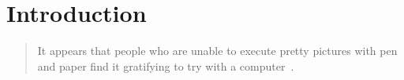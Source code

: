\newcommand{\bq}{}
\newcommand{\dpic}{{\bq dpic}\xspace}
\newcommand{\Dpic}{{\bq Dpic}\xspace}
\newcommand{\dvips}{{\bq dvips}\xspace}
\newcommand{\gpic}{{\bq gpic}\xspace}
\newcommand{\Gpic}{{\bq Gpic}\xspace}
\newcommand{\groff}{{\bq groff}\xspace}
\newcommand{\latex}{\LaTeX\xspace}
\newcommand{\linespec}{{\sl linespec}\xspace}
\newcommand{\MetaPost}{{\bq MetaPost}\xspace}
\newcommand{\Mfour}{{\bq m4}\xspace}
\newcommand{\mfpic}{{\bq mfpic}\xspace}
\newcommand{\PDF}{{\bq PDF}\xspace}
\newcommand{\pic}{{\bq pic}\xspace}
\newcommand{\Pic}{{\bq Pic}\xspace}
\newcommand{\Postscript}{{\bq Postscript}\xspace}
\newcommand{\PSTricks}{{\bq PSTricks}\xspace}
\newcommand{\SVG}{{\bq SVG}\xspace}
\newcommand{\tex}{\TeX\xspace}
\newcommand{\Textregistered}{\textregistered\xspace}
\newcommand{\TPGF}{{\bq Ti{\it k}z~PGF}\xspace}
\newcommand{\Tikz}{{\bq Ti{\it k}z}\xspace}
\newcommand{\tpic}{{\bq tpic}\xspace}
\newcommand{\xfig}{{\bq xfig}\xspace}
\newcommand{\Xfig}{{\bq Xfig}\xspace}
%
\newcommand{\xection}[1]{\section[\texorpdfstring{#1\ \dotfill}{#1}]{#1}}
\newcommand{\NVL}{\\\hspace*{\parindent}}
\newcommand{\brtt}{\hfill\break\hspace*\parindent}
\newcommand{\lbr}{{\tt\char123}}
\newcommand{\rbr}{{\tt\char125}}
\newcommand{\bsl}{{\tt\char92}}
\newcommand{\SR}[1]{\hyperref[#1]{Section~\ref*{#1}}}
\newcommand{\PR}[1]{\hyperref[#1]{page~\pageref*{#1}}}
\newcommand{\FR}[1]{\hyperref[#1]{Figure~\ref*{#1}}}
\newcommand{\FRS}[1]{\hyperref[#1]{Figures~\ref*{#1}}}
\newcommand{\REF}[1]{\hyperref[#1]{\ref*{#1}}}
\newcommand{\LQ}{\char96}
\newcommand{\RQ}{\char39}
%
\newcommand{\Example}[1]{\vspace{\parsep}\noindent {\bf Example #1:}}
%
%
\xection{Introduction\label{Introduction:}}
   \begin{quotation}\noindent
   It appears that people
   who are unable to execute pretty pictures with pen and paper find it
   gratifying to try with a computer~\cite{Landauer95}.
   \end{quotation}

